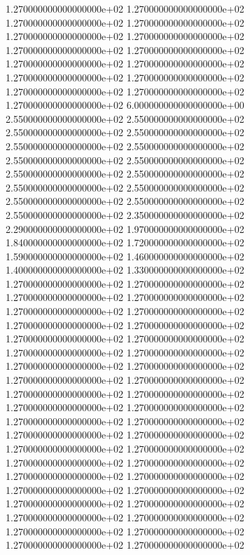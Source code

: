 1.270000000000000000e+02 1.270000000000000000e+02 1.270000000000000000e+02 1.270000000000000000e+02 1.270000000000000000e+02 1.270000000000000000e+02 1.270000000000000000e+02 1.270000000000000000e+02 1.270000000000000000e+02 1.270000000000000000e+02 1.270000000000000000e+02 1.270000000000000000e+02 1.270000000000000000e+02 1.270000000000000000e+02 1.270000000000000000e+02 6.000000000000000000e+00 2.550000000000000000e+02 2.550000000000000000e+02 2.550000000000000000e+02 2.550000000000000000e+02 2.550000000000000000e+02 2.550000000000000000e+02 2.550000000000000000e+02 2.550000000000000000e+02 2.550000000000000000e+02 2.550000000000000000e+02 2.550000000000000000e+02 2.550000000000000000e+02 2.550000000000000000e+02 2.550000000000000000e+02 2.550000000000000000e+02 2.350000000000000000e+02 2.290000000000000000e+02 1.970000000000000000e+02 1.840000000000000000e+02 1.720000000000000000e+02 1.590000000000000000e+02 1.460000000000000000e+02 1.400000000000000000e+02 1.330000000000000000e+02 1.270000000000000000e+02 1.270000000000000000e+02 1.270000000000000000e+02 1.270000000000000000e+02 1.270000000000000000e+02 1.270000000000000000e+02 1.270000000000000000e+02 1.270000000000000000e+02 1.270000000000000000e+02 1.270000000000000000e+02 1.270000000000000000e+02 1.270000000000000000e+02 1.270000000000000000e+02 1.270000000000000000e+02 1.270000000000000000e+02 1.270000000000000000e+02 1.270000000000000000e+02 1.270000000000000000e+02 1.270000000000000000e+02 1.270000000000000000e+02 1.270000000000000000e+02 1.270000000000000000e+02 1.270000000000000000e+02 1.270000000000000000e+02 1.270000000000000000e+02 1.270000000000000000e+02 1.270000000000000000e+02 1.270000000000000000e+02 1.270000000000000000e+02 1.270000000000000000e+02 1.270000000000000000e+02 1.270000000000000000e+02 1.270000000000000000e+02 1.270000000000000000e+02 1.270000000000000000e+02 1.270000000000000000e+02 1.270000000000000000e+02 1.270000000000000000e+02 1.270000000000000000e+02 1.270000000000000000e+02
